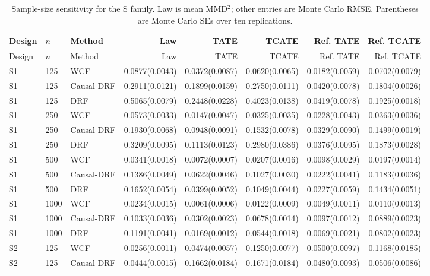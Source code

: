 \begingroup
\tiny
\setlength{\tabcolsep}{1.5pt}
\begin{longtable}{lllrrrrr}
\caption{Sample-size sensitivity for the S family. Law is mean MMD$^2$; other entries are Monte Carlo RMSE. Parentheses are Monte Carlo SEs over ten replications.}\label{tab:sample-size-s}\\
\toprule
Design & $n$ & Method & Law & TATE & TCATE & Ref. TATE & Ref. TCATE \\
\midrule
\endfirsthead
\toprule
Design & $n$ & Method & Law & TATE & TCATE & Ref. TATE & Ref. TCATE \\
\midrule
\endhead
S1 & 125 & WCF & 0.0877(0.0043) & 0.0372(0.0087) & 0.0620(0.0065) & 0.0182(0.0059) & 0.0702(0.0079) \\
S1 & 125 & Causal-DRF & 0.2911(0.0121) & 0.1899(0.0159) & 0.2750(0.0111) & 0.0420(0.0078) & 0.1804(0.0026) \\
S1 & 125 & DRF & 0.5065(0.0079) & 0.2448(0.0228) & 0.4023(0.0138) & 0.0419(0.0078) & 0.1925(0.0018) \\
\addlinespace
S1 & 250 & WCF & 0.0573(0.0033) & 0.0147(0.0047) & 0.0325(0.0035) & 0.0228(0.0043) & 0.0363(0.0036) \\
S1 & 250 & Causal-DRF & 0.1930(0.0068) & 0.0948(0.0091) & 0.1532(0.0078) & 0.0329(0.0090) & 0.1499(0.0019) \\
S1 & 250 & DRF & 0.3209(0.0095) & 0.1113(0.0123) & 0.2980(0.0386) & 0.0376(0.0095) & 0.1873(0.0028) \\
\addlinespace
S1 & 500 & WCF & 0.0341(0.0018) & 0.0072(0.0007) & 0.0207(0.0016) & 0.0098(0.0029) & 0.0197(0.0014) \\
S1 & 500 & Causal-DRF & 0.1386(0.0049) & 0.0622(0.0046) & 0.1027(0.0030) & 0.0222(0.0041) & 0.1183(0.0036) \\
S1 & 500 & DRF & 0.1652(0.0054) & 0.0399(0.0052) & 0.1049(0.0044) & 0.0227(0.0059) & 0.1434(0.0051) \\
\addlinespace
S1 & 1000 & WCF & 0.0234(0.0015) & 0.0061(0.0006) & 0.0122(0.0009) & 0.0049(0.0011) & 0.0110(0.0013) \\
S1 & 1000 & Causal-DRF & 0.1033(0.0036) & 0.0302(0.0023) & 0.0678(0.0014) & 0.0097(0.0012) & 0.0889(0.0023) \\
S1 & 1000 & DRF & 0.1191(0.0041) & 0.0169(0.0012) & 0.0544(0.0018) & 0.0069(0.0021) & 0.0802(0.0023) \\
\addlinespace
\midrule
S2 & 125 & WCF & 0.0256(0.0011) & 0.0474(0.0057) & 0.1250(0.0077) & 0.0500(0.0097) & 0.1168(0.0185) \\
S2 & 125 & Causal-DRF & 0.0444(0.0015) & 0.1662(0.0184) & 0.1671(0.0184) & 0.0480(0.0093) & 0.0506(0.0086) \\

\end{longtable}

